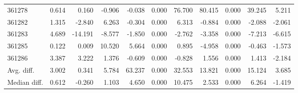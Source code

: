 \begin{tabular}{lrrrrrrrrrr}
361278 & 0.614 & 0.160 & -0.906 & -0.038 & 0.000 & 76.700 & 80.415 & 0.000 & 39.245 & 5.211 \\
361282 & 1.315 & -2.840 & 6.263 & -0.304 & 0.000 & 6.313 & -0.884 & 0.000 & -2.088 & -2.061 \\
361283 & 4.689 & -14.191 & -8.577 & -1.850 & 0.000 & -2.762 & -3.358 & 0.000 & -7.213 & -6.615 \\
361285 & 0.122 & 0.009 & 10.520 & 5.664 & 0.000 & 0.895 & -4.958 & 0.000 & -0.463 & -1.573 \\
361286 & 3.387 & 3.222 & 1.376 & -0.609 & 0.000 & -0.828 & 1.556 & 0.000 & 1.413 & -2.184 \\
Avg. diff. & 3.002 & 0.341 & 5.784 & 63.237 & 0.000 & 32.553 & 13.821 & 0.000 & 15.124 & 3.685 \\
Median diff. & 0.612 & -0.260 & 1.103 & 4.650 & 0.000 & 10.475 & 2.533 & 0.000 & 6.264 & -1.419 \\
\bottomrule
\end{tabular}
